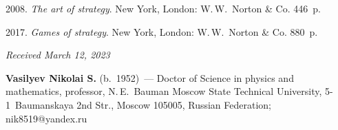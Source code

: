 \begin{multicols}{2}
{{\begin{thebibliography}{99}
 2008. \textit{The art of strategy}. New York, London: 
W.\,W.~Norton \& Co. 446~p.

 2017. \textit{Games of strategy}. New York, 
London: W.\,W.~Norton \& Co. 880~p.
\end{thebibliography}

 }
 }

\end{multicols}

\vspace*{-6pt}

\hfill{\small\textit{Received March 12, 2023}} 

\Contrl

\noindent
\textbf{Vasilyev Nikolai S.} (b.\ 1952)~--- Doctor of Science in physics and mathematics, professor, 
N.\,E.~Bauman Moscow State Technical University, 5-1~Baumanskaya 2nd Str., Moscow 105005, 
Russian Federation; \mbox{nik8519@yandex.ru}
     



\label{end\stat}

\renewcommand{\bibname}{\protect\rm Литература} 